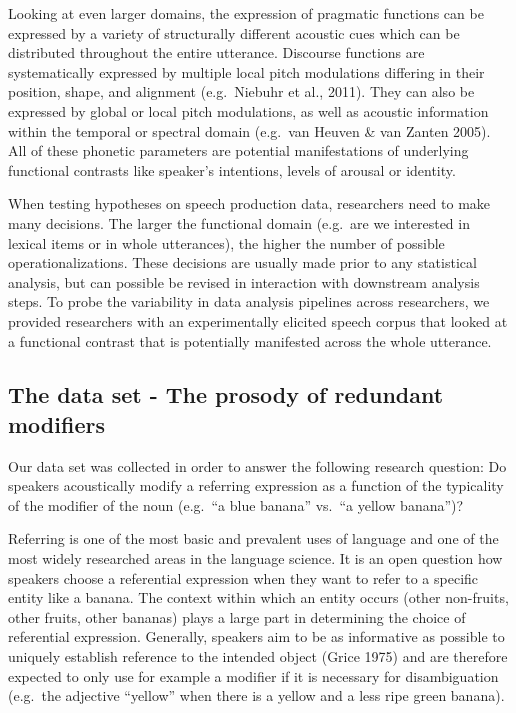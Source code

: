 \documentclass[
  english,
  man]{apa6}
\begin{document}
Looking at even larger domains, the expression of pragmatic functions can be expressed by a variety of structurally different acoustic cues which can be distributed throughout the entire utterance.
Discourse functions are systematically expressed by multiple local pitch modulations differing in their position, shape, and alignment (e.g.~Niebuhr et al., 2011).
They can also be expressed by global or local pitch modulations, as well as acoustic information within the temporal or spectral domain (e.g.~van Heuven \& van Zanten 2005).
All of these phonetic parameters are potential manifestations of underlying functional contrasts like speaker's intentions, levels of arousal or identity.

When testing hypotheses on speech production data, researchers need to make many decisions.
The larger the functional domain (e.g.~are we interested in lexical items or in whole utterances), the higher the number of possible operationalizations.
These decisions are usually made prior to any statistical analysis, but can possible be revised in interaction with downstream analysis steps.
To probe the variability in data analysis pipelines across researchers, we provided researchers with an experimentally elicited speech corpus that looked at a functional contrast that is potentially manifested across the whole utterance.

\hypertarget{the-data-set---the-prosody-of-redundant-modifiers}{%
\subsection{The data set - The prosody of redundant modifiers}\label{the-data-set---the-prosody-of-redundant-modifiers}}

Our data set was collected in order to answer the following research question: Do speakers acoustically modify a referring expression as a function of the typicality of the modifier of the noun (e.g.~\enquote{a blue banana} vs.~\enquote{a yellow banana})?

Referring is one of the most basic and prevalent uses of language and one of the most widely researched areas in the language science.
It is an open question how speakers choose a referential expression when they want to refer to a specific entity like a banana.
The context within which an entity occurs (other non-fruits, other fruits, other bananas) plays a large part in determining the choice of referential expression.
Generally, speakers aim to be as informative as possible to uniquely establish reference to the intended object (Grice 1975) and are therefore expected to only use for example a modifier if it is necessary for disambiguation (e.g.~the adjective \enquote{yellow} when there is a yellow and a less ripe green banana).
\end{document}
